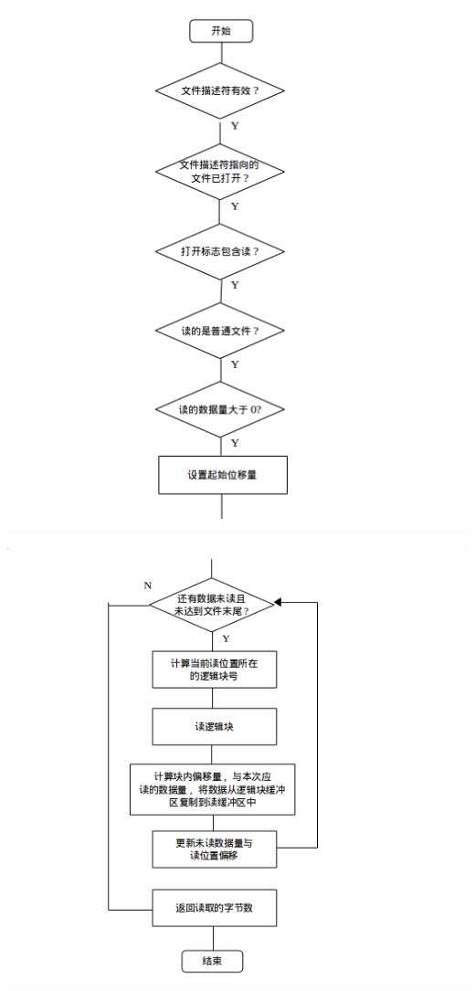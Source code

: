 \documentclass[nofonts, titlepage]{ctexart}
\begin{document}
\begin{itemize}
  \includegraphics[width=15cm]{./images/./read_1.png}

  \includegraphics[width=15cm]{./images/./read_2.png}
  \end{itemize}
\end{document}
